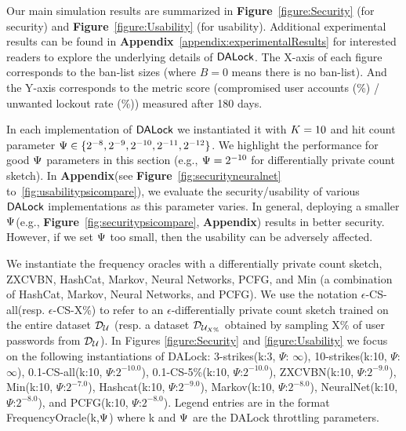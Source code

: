 Our main simulation results are summarized in \textbf{Figure}~\ref{figure:Security} (for security) and \textbf{Figure}~\ref{figure:Usability} (for usability). Additional experimental results can be found in \textbf{Appendix}~\ref{appendix:experimentalResults} for interested readers to explore the underlying details of $\mathsf{DALock}$.  The X-axis of each figure corresponds to the ban-list sizes (where $B= 0$ means there is no ban-list). And the Y-axis corresponds to the metric score (compromised user accounts (\%) / unwanted lockout rate (\%)) measured after 180 days. 


 In each implementation of $\mathsf{DALock}$ we instantiated it with $K=10$ and hit count parameter $\Psi \in \{ 2^{-8},2^{-9},2^{-10},2^{-11},2^{-12}\}$. We highlight the performance for good $\Psi$ parameters in this section (e.g., $\Psi = 2^{-10}$ for differentially private count sketch). In \textbf{Appendix}(see \textbf{Figure}~\ref{fig:securityneuralnet} to~\ref{fig:usabilitypsicompare}), we evaluate the security/usability of various $\mathsf{DALock}$ implementations as this parameter varies. In general, deploying a smaller $\Psi$(e.g., \textbf{Figure}~\ref{fig:securitypsicompare}, \textbf{Appendix}) results in better security. However, if we set $\Psi$ too small, then the usability can be adversely affected.


We instantiate the frequency oracles with a differentially private count sketch, ZXCVBN, HashCat, Markov, Neural Networks, PCFG, and Min (a combination of HashCat, Markov, Neural Networks, and PCFG). We use the notation $\epsilon$-CS-all(resp. $\epsilon$-CS-X\%) to refer to an $\epsilon$-differentially private count sketch trained on the entire dataset $\mathcal{D}_{{\mathcal{U}}}$ (resp. a dataset $\mathcal{D}_{{\mathcal{U}_{X\%}}}$ obtained by sampling X\% of user passwords from $\mathcal{D}_{{\mathcal{U}}}$). In Figures \ref{figure:Security} and \ref{figure:Usability} we focus on the following instantiations of DALock: 3-strikes(k:3, $\Psi$: $\infty$), 10-strikes(k:10, $\Psi$: $\infty$), 0.1-CS-all(k:10, $\Psi$:$2^{-10.0}$), 0.1-CS-5\%(k:10, $\Psi$:$2^{-10.0}$), ZXCVBN(k:10, $\Psi$:$2^{-9.0}$), Min(k:10, $\Psi$:$2^{-7.0}$), Hashcat(k:10, $\Psi$:$2^{-9.0}$), Markov(k:10, $\Psi$:$2^{-8.0}$), NeuralNet(k:10, $\Psi$:$2^{-8.0}$), and PCFG(k:10, $\Psi$:$2^{-8.0}$). Legend entries are in the format FrequencyOracle(k,$\Psi$) where k and $\Psi$ are the DALock throttling parameters.

